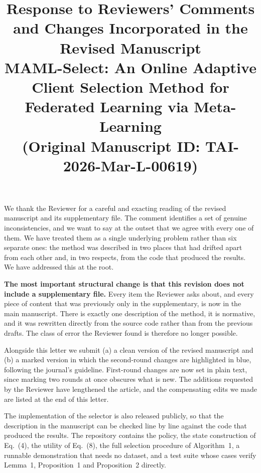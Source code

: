 \documentclass[10pt]{article}
\newcommand{\paperTitle}{MAML-Select: An Online Adaptive Client Selection Method for Federated Learning via Meta-Learning}
\begin{document}
\title{
\small Response to Reviewers' Comments and Changes Incorporated in the Revised Manuscript \\
\vspace{1em}
{\Large \bf \paperTitle} \\
(\textbf{Original Manuscript ID: TAI-2026-Mar-L-00619})
}
\date{}
\maketitle

\vspace{-3em}

We thank the Reviewer for a careful and exacting reading of the revised manuscript and its supplementary file. The comment identifies a set of genuine inconsistencies, and we want to say at the outset that we agree with every one of them. We have treated them as a single underlying problem rather than six separate ones: the method was described in two places that had drifted apart from each other and, in two respects, from the code that produced the results. We have addressed this at the root.

\textbf{The most important structural change is that this revision does not include a supplementary file.} Every item the Reviewer asks about, and every piece of content that was previously only in the supplementary, is now in the main manuscript. There is exactly one description of the method, it is normative, and it was rewritten directly from the source code rather than from the previous drafts. The class of error the Reviewer found is therefore no longer possible.

Alongside this letter we submit (a) a clean version of the revised manuscript and (b) a marked version in which the second-round changes are highlighted in blue, following the journal's guideline. First-round changes are now set in plain text, since marking two rounds at once obscures what is new. The additions requested by the Reviewer have lengthened the article, and the compensating edits we made are listed at the end of this letter.

The implementation of the selector is also released publicly, so that the description in the manuscript can be checked line by line against the code that produced the results. The repository contains the policy, the state construction of Eq.~(4), the utility of Eq.~(8), the full selection procedure of Algorithm~1, a runnable demonstration that needs no dataset, and a test suite whose cases verify Lemma~1, Proposition~1 and Proposition~2 directly.
\end{document}
